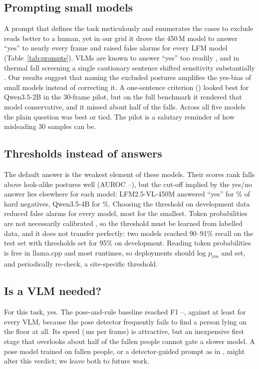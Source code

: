 \subsection{Prompting small models}
A prompt that defines the task meticulously and enumerates the cases to exclude reads better to a human, yet in our grid it drove the 450\,M model to answer ``yes'' to nearly every frame and raised false alarms for every LFM model (Table~\ref{tab:prompts}). VLMs are known to answer ``yes'' too readily \cite{li2023pope,chan2026yesbias}, and in thermal fall screening a single cautionary sentence shifted sensitivity substantially \cite{junca2026thermal}. Our results suggest that naming the excluded postures amplifies the yes-bias of small models instead of correcting it. A one-sentence criterion (\promptBtwo) looked best for Qwen3.5-2B in the 30-frame pilot, but on the full benchmark it rendered that model conservative, and it missed about half of the falls. Across all five models the plain question was best or tied. The pilot is a salutary reminder of how misleading 30 samples can be.

\subsection{Thresholds instead of answers}
The default answer is the weakest element of these models. Their scores rank falls above look-alike postures well (AUROC \RLfmSAuroc--\RLfmLAuroc), but the cut-off implied by the yes/no answer lies elsewhere for each model: LFM2.5-VL-450M answered ``yes'' for \RLfmSDefFarHard\% of hard negatives, Qwen3.5-4B for \RQwenLDefFarHard\%. Choosing the threshold on development data reduced false alarms for every model, most for the smallest. Token probabilities are not necessarily calibrated \cite{guo2017calibration}, so the threshold must be learned from labelled data, and it does not transfer perfectly: two models reached 90--91\% recall on the test set with thresholds set for 95\% on development. Reading token probabilities is free in llama.cpp and most runtimes, so deployments should log $p_\text{yes}$ and set, and periodically re-check, a site-specific threshold.

\subsection{Is a VLM needed?}
For this task, yes. The pose-and-rule baseline reached F1 \CPoseNPoseNatOneFone--\CPoseNPoseNatFourFone, against at least \RLfmSCalFone{} for every VLM, because the pose detector frequently fails to find a person lying on the floor at all. Its speed (\RPoseNMs\,ms per frame) is attractive, but an inexpensive first stage that overlooks about half of the fallen people cannot gate a slower model. A pose model trained on fallen people, or a detector-guided prompt as in \cite{adil2026svlm}, might alter this verdict; we leave both to future work.

